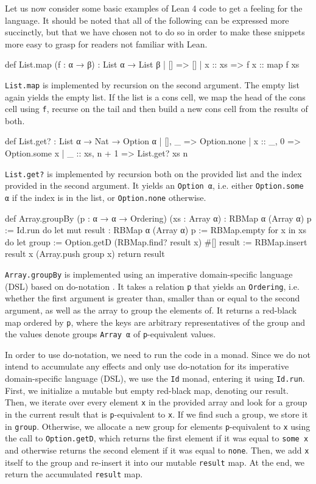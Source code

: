 Let us now consider some basic examples of Lean 4 code to get a feeling for the language. It should be noted that all of the following can be expressed more succinctly, but that we have chosen not to do so in order to make these snippets more easy to grasp for readers not familiar with Lean.
\begin{code}
def List.map (f : α → β) : List α → List β
  | []      => []
  | x :: xs => f x :: map f xs
\end{code}
\lstinline|List.map| is implemented by recursion on the second argument. The empty list again yields the empty list. If the list is a cons cell, we map the head of the cons cell using \lstinline|f|, recurse on the tail and then build a new cons cell from the results of both.
\begin{code}
def List.get? : List α → Nat → Option α
  | [],      _     => Option.none
  | x :: _,  0     => Option.some x
  | _ :: xs, n + 1 => List.get? xs n
\end{code}
\lstinline|List.get?| is implemented by recursion both on the provided list and the index provided in the second argument. It yields an \lstinline|Option α|, i.e. either \lstinline|Option.some α| if the index is in the list, or \lstinline|Option.none| otherwise.
\begin{code}
def Array.groupBy (p : α → α → Ordering) (xs : Array α)
  : RBMap α (Array α) p := Id.run do
  let mut result : RBMap α (Array α) p := RBMap.empty
  for x in xs do
    let group := Option.getD (RBMap.find? result x) #[]
    result := RBMap.insert result x (Array.push group x)
  return result
\end{code}
\lstinline|Array.groupBy| is implemented using an imperative domain-specific language (DSL) based on do-notation \citep{ullrich_beyond_2022}. It takes a relation \lstinline|p| that yields an \lstinline|Ordering|, i.e. whether the first argument is greater than, smaller than or equal to the second argument, as well as the array to group the elements of. It returns a red-black map ordered by \lstinline|p|, where the keys are arbitrary representatives of the group and the values denote groups \lstinline|Array α| of \lstinline|p|-equivalent values.

In order to use do-notation, we need to run the code in a monad. Since we do not intend to accumulate any effects and only use do-notation for its imperative domain-specific language (DSL), we use the \lstinline|Id| monad, entering it using \lstinline|Id.run|. First, we initialize a mutable but empty red-black map, denoting our result. Then, we iterate over every element \lstinline|x| in the provided array and look for a group in the current result that is \lstinline|p|-equivalent to \lstinline|x|. If we find such a group, we store it in \lstinline|group|. Otherwise, we allocate a new group for elements \lstinline|p|-equivalent to \lstinline|x| using the call to \lstinline|Option.getD|, which returns the first element if it was equal to \lstinline|some x| and otherwise returns the second element if it was equal to \lstinline|none|. Then, we add \lstinline|x| itself to the group and re-insert it into our mutable \lstinline|result| map. At the end, we return the accumulated \lstinline|result| map.

